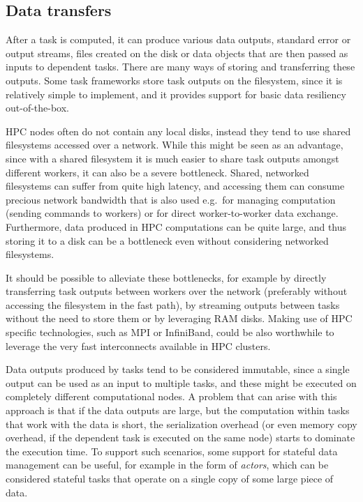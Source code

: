 \subsection{Data transfers}
After a task is computed, it can produce various data outputs, standard error or output
streams, files created on the disk or data objects that are then passed as inputs to dependent
tasks. There are many ways of storing and transferring these outputs. Some task frameworks store
task outputs on the filesystem, since it is relatively simple to implement, and it provides
support for basic data resiliency out-of-the-box.

HPC nodes often do not contain any local disks, instead they tend to use shared filesystems
accessed over a network. While this might be seen as an advantage, since with a shared filesystem
it is much easier to share task outputs amongst different workers, it can also be a severe
bottleneck. Shared, networked filesystems can suffer from quite high latency, and accessing them
can consume precious network bandwidth that is also used e.g.\ for managing computation
(sending commands to workers) or for direct worker-to-worker data exchange.
Furthermore, data produced in HPC computations can be quite large, and thus storing it to a disk
can be a bottleneck even without considering networked filesystems.

It should be possible to alleviate these bottlenecks, for example by directly transferring task
outputs between workers over the network (preferably without accessing the filesystem in the
fast path), by streaming outputs between tasks without the need to store them or by leveraging
RAM disks. Making use of HPC specific technologies, such as MPI or InfiniBand, could be also
worthwhile to leverage the very fast interconnects available in HPC clusters.

Data outputs produced by tasks tend to be considered immutable, since a single output can be
used as an input to multiple tasks, and these might be executed on completely different
computational nodes. A problem that can arise with this approach is that if the data outputs are
large, but the computation within tasks that work with the data is short, the serialization
overhead
(or even memory copy overhead, if the dependent task is executed on the same node) starts to
dominate the execution time. To support such scenarios, some support for stateful data management
can be useful, for example in the form of \emph{actors}, which can be considered stateful tasks
that
operate on a single copy of some large piece of data.

